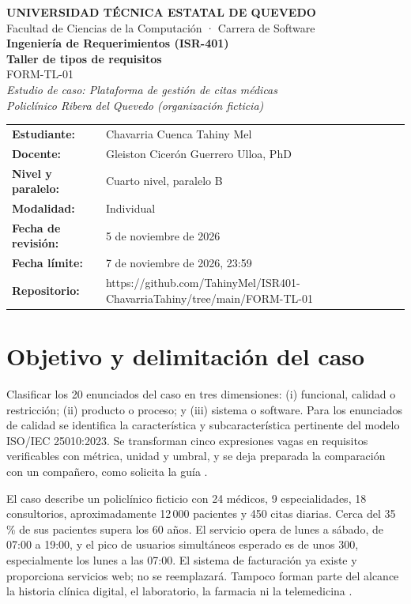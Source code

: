 \documentclass[11pt,a4paper]{article}
\newcommand{\NombreEstudiante}{Chavarria Cuenca Tahiny Mel}
\newcommand{\RepoTexto}{https://github.com/TahinyMel/ISR401-ChavarriaTahiny/tree/main/FORM-TL-01}
\newcommand{\FechaRevision}{5 de noviembre de 2026}
\newcommand{\Docente}{Gleiston Cicerón Guerrero Ulloa, PhD}
\begin{document}
\begin{center}
{\Large\bfseries\color{verdeUTEQ} UNIVERSIDAD TÉCNICA ESTATAL DE QUEVEDO}\\[4pt]
{\small Facultad de Ciencias de la Computación · Carrera de Software}\\[13pt]
{\large\bfseries Ingeniería de Requerimientos (ISR-401)}\\[5pt]
{\LARGE\bfseries Taller de tipos de requisitos}\\[4pt]
{\large FORM-TL-01}\\[9pt]
{\small\itshape Estudio de caso: Plataforma de gestión de citas médicas\\
Policlínico Ribera del Quevedo (organización ficticia)}
\end{center}
\vspace{0.3cm}
\begin{tabularx}{\textwidth}{>{\bfseries}p{3.4cm}X}
Estudiante: & \NombreEstudiante\\
Docente: & \Docente\\
Nivel y paralelo: & Cuarto nivel, paralelo B\\
Modalidad: & Individual\\
Fecha de revisión: & \FechaRevision\\
Fecha límite: & 7 de noviembre de 2026, 23:59\\
Repositorio: & \RepoTexto\\
\end{tabularx}
\vspace{0.25cm}


\section{Objetivo y delimitación del caso}
Clasificar los 20 enunciados del caso en tres dimensiones: (i) funcional, calidad o restricción; (ii) producto o proceso; y (iii) sistema o software. Para los enunciados de calidad se identifica la característica y subcaracterística pertinente del modelo ISO/IEC 25010:2023. Se transforman cinco expresiones vagas en requisitos verificables con métrica, unidad y umbral, y se deja preparada la comparación con un compañero, como solicita la guía \cite{guia2026,pohl2025,iso29148,iso25010}.

El caso describe un policlínico ficticio con 24 médicos, 9 especialidades, 18 consultorios, aproximadamente 12\,000 pacientes y 450 citas diarias. Cerca del 35\,\% de sus pacientes supera los 60 años. El servicio opera de lunes a sábado, de 07:00 a 19:00, y el pico de usuarios simultáneos esperado es de unos 300, especialmente los lunes a las 07:00. El sistema de facturación ya existe y proporciona servicios web; no se reemplazará. Tampoco forman parte del alcance la historia clínica digital, el laboratorio, la farmacia ni la telemedicina \cite{guia2026}.
\end{document}
